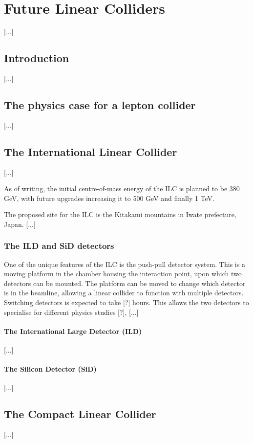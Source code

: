 \chapter{Future Linear Colliders}
[...]

\section{Introduction}
[...]

\section{The physics case for a lepton collider}
[...]

\section{The International Linear Collider}
[...]

As of writing, the initial centre-of-mass energy of the ILC is planned to be 380 GeV, with future upgrades increasing it to 500 GeV and finally 1 TeV.

The proposed site for the ILC is the Kitakami mountains in Iwate prefecture, Japan. [...]

\subsection{The ILD and SiD detectors}
One of the unique features of the ILC is the push-pull detector system. This is a moving platform in the chamber housing the interaction point, upon which two detectors can be mounted. The platform can be moved to change which detector is in the beamline, allowing a linear collider to function with multiple detectors. Switching detectors is expected to take [?] hours. This allows the two detectors to specialise for different physics studies [?], [...]

\subsubsection{The International Large Detector (ILD)}
[...]

\subsubsection{The Silicon Detector (SiD)}
[...]

\section{The Compact Linear Collider}
[...]